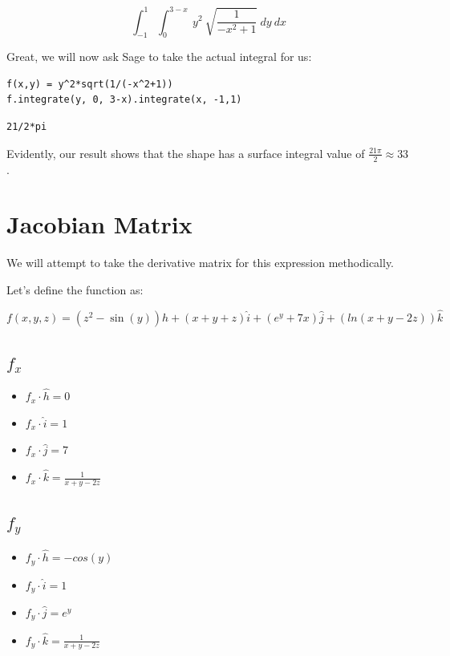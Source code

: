 \documentclass[letterpaper]{article}
\begin{document}
\begin{equation}
   \int_{-1}^1 \int_0^{3-x} \ y^2\ \sqrt{\frac{1}{-x^2+1}}\ dy\ dx
\end{equation}

Great, we will now ask Sage to take the actual integral for us:

\begin{verbatim}
f(x,y) = y^2*sqrt(1/(-x^2+1))
f.integrate(y, 0, 3-x).integrate(x, -1,1)
\end{verbatim}

\begin{verbatim}
21/2*pi
\end{verbatim}


Evidently, our result shows that the shape has a surface integral value of \(\frac{21\pi}{2} \approx 33\).

\section{Jacobian Matrix}
\label{sec:org10f8908}
We will attempt to take the derivative matrix for this expression methodically.

Let's define the function as:

\begin{equation}
   f(x,y,z) = (z^2-\sin(y)) \hat{h} + (x+y+z) \hat{i} + (e^y +7x) \hat{j} + (ln(x+y-2z)) \hat{k}
\end{equation}

\subsection{\(f_x\)}
\label{sec:org836518d}
\begin{itemize}
\item \(f_x \cdot {\hat{h}} = 0\)
\item \(f_x \cdot {\hat{i}} = 1\)
\item \(f_x \cdot {\hat{j}} = 7\)
\item \(f_x \cdot {\hat{k}} = \frac{1}{x+y-2z}\)
\end{itemize}

\subsection{\(f_y\)}
\label{sec:orgda543e9}
\begin{itemize}
\item \(f_y \cdot {\hat{h}} = -cos(y)\)
\item \(f_y \cdot {\hat{i}} = 1\)
\item \(f_y \cdot {\hat{j}} = e^y\)
\item \(f_y \cdot {\hat{k}} = \frac{1}{x+y-2z}\)
\end{itemize}
\end{document}
